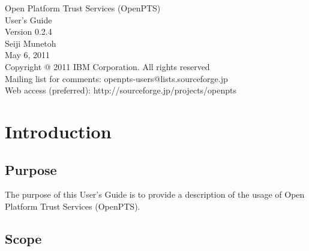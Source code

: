 \documentclass[10pt,a4paper]{article}
\begin{document}
 

\begin{titlepage}
\vspace*{7cm}
\begin{center}
{\Large Open Platform Trust Services (OpenPTS)\\User's Guide\\[1ex]\large Version 0.2.4}\\
\vspace*{1cm}
{\large Seiji Munetoh}\\
\vspace*{0.5cm}
{\small May 6, 2011}\\
\vspace*{2.0cm}
{\small Copyright @ 2011 IBM Corporation. All rights reserved}\\
{\small Mailing list for comments: openpts-users@lists.sourceforge.jp}\\
{\small Web access (preferred): http://sourceforge.jp/projects/openpts}\\
\end{center}
\end{titlepage}

{}

\tableofcontents

\clearpage 
{}

\section{Introduction} 

\subsection{Purpose} 

The purpose of this User's Guide is to provide a description of
the usage of Open Platform Trust Services (OpenPTS).

\subsection{Scope} 
\end{document}
